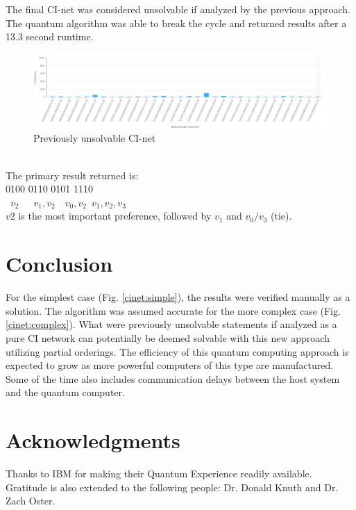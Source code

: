 \documentclass[12pt]{article}
\begin{document}
\begin{flushleft}
\par{
The final CI-net was considered unsolvable if analyzed by the previous approach. The quantum algorithm was able to break the cycle and returned results after a 13.3 second runtime.}
\begin{figure}[h!]
\includegraphics[width=\linewidth]{chart3.png}
\caption{Previously unsolvable CI-net}
\end{figure}
\ \\
The primary result returned is:\\
0100 0110 0101 1110\\
~$v_2$~~~$v_1,v_2$~~$v_0,v_2$~$v_1,v_2,v_3$\\
$v2$ is the most important preference, followed by $v_1$ and $v_0/v_3$ (tie).

\newpage

\section{Conclusion}
For the simplest case (Fig. \ref{cinet:simple}), the results were verified manually as a solution. The algorithm was assumed accurate for the more complex case (Fig. \ref{cinet:complex}).
What were previously unsolvable statements if analyzed as a pure CI network can potentially be deemed solvable with this new approach utilizing partial orderings.
The efficiency of this quantum computing approach is expected to grow as more powerful computers of this type are manufactured. Some of the time also includes communication delays between the host system and the quantum computer.

\section{Acknowledgments}
Thanks to IBM for making their Quantum Experience readily available. Gratitude is also extended to the following people: Dr. Donald Knuth and Dr. Zach Oster.

\newpage



\end{flushleft}
\end{document}

